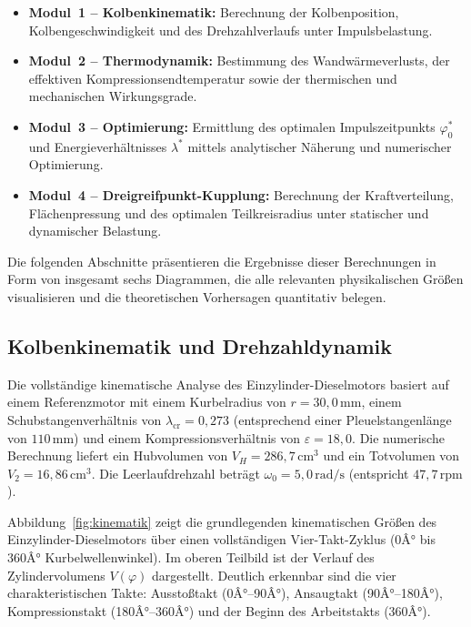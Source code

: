 ﻿\documentclass[a4paper,12pt]{article}
\begin{document}
\begin{itemize}
  \item \textbf{Modul~1 -- Kolbenkinematik:} Berechnung der
    Kolbenposition, Kolbengeschwindigkeit und des Drehzahlverlaufs
    unter Impulsbelastung.
  \item \textbf{Modul~2 -- Thermodynamik:} Bestimmung des Wandwärmeverlusts,
    der effektiven Kompressionsendtemperatur sowie der thermischen und
    mechanischen Wirkungsgrade.
  \item \textbf{Modul~3 -- Optimierung:} Ermittlung des optimalen
    Impulszeitpunkts $\varphi_0^*$ und Energieverhältnisses $\lambda^*$
    mittels analytischer Näherung und numerischer Optimierung.
  \item \textbf{Modul~4 -- Dreigreifpunkt-Kupplung:} Berechnung der
    Kraftverteilung, Flächenpressung und des optimalen Teilkreisradius
    unter statischer und dynamischer Belastung.
\end{itemize}

Die folgenden Abschnitte präsentieren die Ergebnisse dieser Berechnungen
in Form von insgesamt sechs Diagrammen, die alle relevanten physikalischen
Größen visualisieren und die theoretischen Vorhersagen quantitativ belegen.

\subsection{Kolbenkinematik und Drehzahldynamik}

Die vollständige kinematische Analyse des Einzylinder-Dieselmotors basiert
auf einem Referenzmotor mit einem Kurbelradius von $r = 30{,}0\,\text{mm}$,
einem Schubstangenverhältnis von $\lambda_\text{cr} = 0{,}273$ (entsprechend
einer Pleuelstangenlänge von $110\,\text{mm}$) und einem Kompressionsverhältnis
von $\varepsilon = 18{,}0$. Die numerische Berechnung liefert ein Hubvolumen
von $V_H = 286{,}7\,\text{cm}^3$ und ein Totvolumen von $V_2 = 16{,}86\,\text{cm}^3$.
Die Leerlaufdrehzahl beträgt $\omega_0 = 5{,}0\,\text{rad/s}$ (entspricht
$47{,}7\,\text{rpm}$).

Abbildung~\ref{fig:kinematik} zeigt die grundlegenden kinematischen Größen
des Einzylinder-Dieselmotors über einen vollständigen Vier-Takt-Zyklus
(0Â° bis 360Â° Kurbelwellenwinkel). Im oberen Teilbild ist der Verlauf des
Zylindervolumens $V(\varphi)$ dargestellt. Deutlich erkennbar sind die vier
charakteristischen Takte: Ausstoßtakt (0Â°--90Â°), Ansaugtakt (90Â°--180Â°),
Kompressionstakt (180Â°--360Â°) und der Beginn des Arbeitstakts (360Â°).
\end{document}
